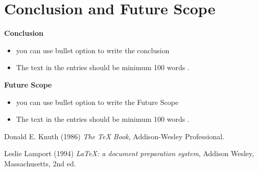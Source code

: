 \documentclass[12pt, letter paper]{report}
\begin{document}
\chapter{Conclusion and Future Scope}

\textbf{Conclusion} 
\begin{itemize}
 \item {you can use bullet option to write the conclusion}
 \item {The text in the entries should be minimum 100 words }.
\end{itemize}
\textbf{Future Scope} 
\begin{itemize}
 \item {you can use bullet option to write the Future Scope}
 \item {The text in the entries should be minimum 100 words }.
\end{itemize}

\begin{thebibliography}{7}
Donald E. Knuth (1986) \emph{The \TeX{} Book}, Addison-Wesley Professional.

Leslie Lamport (1994) \emph{\LaTeX: a document preparation system}, Addison
Wesley, Massachusetts, 2nd ed.
\end{thebibliography}
\end{document}
